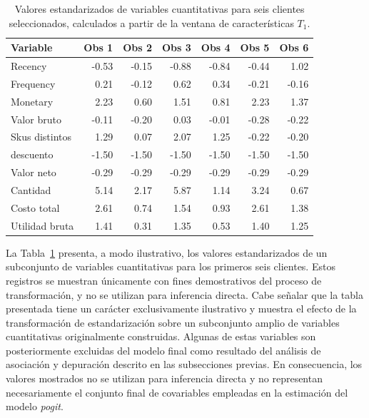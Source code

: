 \begin{table}[H]
    \centering
    \caption{Valores estandarizados de variables cuantitativas para seis clientes seleccionados, calculados a partir de la ventana de características \(T_1\).}
    \label{tab:tablaestandarizada}
    \small
    \renewcommand{\arraystretch}{1.2}
    \begin{tabular}{lrrrrrr}
    \hline
    \textbf{Variable} & \textbf{Obs 1} & \textbf{Obs 2} & \textbf{Obs 3} & \textbf{Obs 4} & \textbf{Obs 5} & \textbf{Obs 6} \\
    \hline
    Recency      & -0.53 & -0.15 & -0.88 & -0.84 & -0.44 &  1.02 \\
    Frequency          &  0.21 & -0.12 &  0.62 &  0.34 & -0.21 & -0.16 \\
    Monetary           &  2.23 &  0.60 &  1.51 &  0.81 &  2.23 &  1.37 \\
    Valor bruto       & -0.11 & -0.20 &  0.03 & -0.01 & -0.28 & -0.22 \\
    Skus distintos    &  1.29 &  0.07 &  2.07 &  1.25 & -0.22 & -0.20 \\
    descuento               & -1.50 & -1.50 & -1.50 & -1.50 & -1.50 & -1.50 \\
    Valor neto        & -0.29 & -0.29 & -0.29 & -0.29 & -0.29 & -0.29 \\
    Cantidad               &  5.14 &  2.17 &  5.87 &  1.14 &  3.24 &  0.67 \\
    Costo total        &  2.61 &  0.74 &  1.54 &  0.93 &  2.61 &  1.38 \\
    Utilidad bruta    &  1.41 &  0.31 &  1.35 &  0.53 &  1.40 &  1.25 \\
    \hline
    \end{tabular}
    \end{table}
    
    La Tabla~\ref{tab:tablaestandarizada} presenta, a modo ilustrativo, los valores estandarizados de un subconjunto de variables cuantitativas para los primeros seis clientes. Estos registros se muestran únicamente con fines demostrativos del proceso de transformación, y no se utilizan para inferencia directa. Cabe señalar que la tabla presentada tiene un carácter exclusivamente ilustrativo y muestra el efecto de la transformación de estandarización sobre un subconjunto amplio de variables cuantitativas originalmente construidas. Algunas de estas variables son posteriormente excluidas del modelo final como resultado del análisis de asociación y depuración descrito en las subsecciones previas. En consecuencia, los valores mostrados no se utilizan para inferencia directa y no representan necesariamente el conjunto final de covariables empleadas en la estimación del modelo \emph{pogit}.

